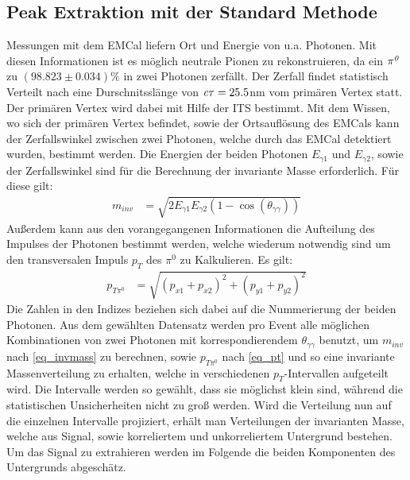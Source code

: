\documentclass[]{article}
\begin{document}
	\subsection{Peak Extraktion mit der Standard Methode}
	Messungen mit dem EMCal liefern Ort und Energie von u.a. Photonen. Mit diesen Informationen ist es m{\"o}glich neutrale Pionen zu rekonstruieren, da ein ${\it \pi^{0}}$ zu $\left( 98.823\pm0.034\right)\%$ in zwei Photonen zerf{\"a}llt. Der Zerfall findet statistisch Verteilt nach eine Durschnitssl{\"a}nge von ${\it c\tau} = 25.5$nm vom prim{\"a}ren Vertex statt. Der prim{\"a}ren Vertex wird dabei mit Hilfe der ITS bestimmt.
	Mit dem Wissen, wo sich der prim{\"a}ren Vertex befindet, sowie der Ortsaufl{\"o}sung des EMCals kann der Zerfallswinkel zwischen zwei Photonen, welche durch das EMCal detektiert wurden, bestimmt werden.
	Die Energien der beiden Photonen $E_{\gamma1}$ und $E_{\gamma2}$, sowie der Zerfallswinkel sind f{\"u}r die Berechnung der invariante Masse erforderlich. F{\"u}r diese gilt:
	\begin{align}
	\label{eq_invmass}
	m_{inv} &= \sqrt{2E_{\gamma1}E_{\gamma2}(1-\cos\left( \theta_{\gamma\gamma}\right) )} 
	\end{align}
	Au{\ss}erdem kann aus den vorangegangenen Informationen die Aufteilung des Impulses der Photonen bestimmt werden, welche wiederum notwendig sind um den transversalen Impuls $p_{T}$ des $\pi^{0}$ zu Kalkulieren.
	Es gilt:
	\begin{align}
	\label{eq_pt}
	p_{T\pi^{0}} &= \sqrt{\left(p_{x1}+p_{x2}\right)^{2} +\left(p_{y1}+p_{y2}\right)^{2}} 
	\end{align}
	Die Zahlen in den Indizes beziehen sich dabei auf die Nummerierung der beiden Photonen.\newline
	Aus dem gew{\"a}hlten Datensatz werden pro Event alle m{\"o}glichen Kombinationen von zwei Photonen mit korrespondierendem $\theta_{\gamma\gamma}$ benutzt, um $m_{inv}$ nach \ref{eq_invmass} zu berechnen, sowie $p_{T\pi^{0}}$ nach \ref{eq_pt} und so eine invariante Massenverteilung zu erhalten, welche in verschiedenen $p_{T}$-Intervallen aufgeteilt wird. Die Intervalle werden so gew{\"a}hlt, dass sie m{\"o}glichst klein sind, w{\"a}hrend die statistischen Unsicherheiten nicht zu gro{\ss} werden.
	\newline
	Wird die Verteilung nun auf die einzelnen Intervalle projiziert, erh{\"a}lt man Verteilungen der invarianten Masse, welche aus Signal, sowie korreliertem und unkorreliertem Untergrund bestehen. Um das Signal zu extrahieren werden im Folgende die beiden Komponenten des Untergrunds abgesch{\"a}tz.
	
\end{document}
